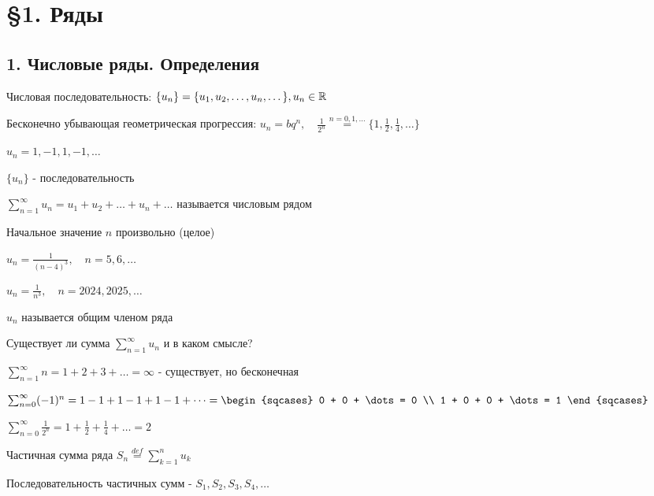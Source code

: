 \documentclass[12pt]{article}
\begin{document}
    \tableofcontents
    \clearpage


    \section{\S 1. Ряды}

    \subsection{1. Числовые ряды. Определения}

    \Mems Числовая последовательность: $\{u_n\} = \{u_1, u_2, \dots, u_n, \dots\}, u_n \in \mathbb{R}$

     Бесконечно убывающая геометрическая прогрессия: $u_n = b q^n, \quad
    \frac{1}{2^n} \stackrel{n = 0,1,\dots}{=} \{1, \frac{1}{2}, \frac{1}{4}, \dots\}$

     $u_n = 1, -1, 1, -1, \dots$

    \Def $\{u_n\}$ - последовательность

    $\sum_{n = 1}^{\infty} u_n = u_1 + u_2 + \dots + u_n + \dots$ называется числовым рядом

    \Notas Начальное значение $n$ произвольно (целое)

    \Ex $u_n = \frac{1}{(n - 4)^3}, \quad n = 5, 6, \dots$

    $u_n = \frac{1}{n^3}, \quad n = 2024, 2025, \dots$

    \Notas $u_n$ называется общим членом ряда

    \Nota Существует ли сумма $\sum_{n = 1}^{\infty} u_n$ и в каком смысле?

     $\sum_{n = 1}^{\infty} n = 1 + 2 + 3 + \dots = \infty$ - существует, но бесконечная

     $\sum_{n = 0}^{\infty} (-1)^n = 1 - 1 + 1 - 1 + 1 - 1 + \dots =
    \begin{sqcases}
        0 + 0 + \dots = 0 \\
        1 + 0 + 0 + \dots = 1
    \end{sqcases}$

     $\sum_{n = 0}^\infty \frac{1}{2^n} = 1 + \frac{1}{2} + \frac{1}{4} + \dots = 2$

    \Def Частичная сумма ряда $S_n \stackrel{def}{=} \sum_{k = 1}^{n} u_k$

    \Notas Последовательность частичных сумм - $S_1, S_2, S_3, S_4, \dots$
\end{document}
